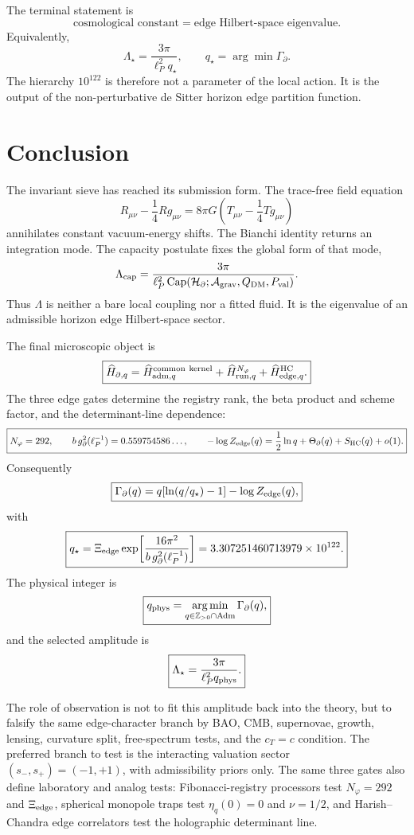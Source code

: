 \documentclass[aps,prd,reprint,nofootinbib,superscriptaddress,floatfix]{revtex4-2}
\numberwithin{equation}{section}
\theoremstyle{definition}
\theoremstyle{plain}
\newcommand{\Agrav}{\mathcal A_{\rm grav}}
\newcommand{\Capacity}{\operatorname{Cap}}
\begin{document}
The terminal statement is
\[
\boxed{
\text{cosmological constant}
=
\text{edge Hilbert-space eigenvalue}.
}
\]
Equivalently,
\[
\boxed{
\Lambda_\star
=
\frac{3\pi}{\ell_P^2 q_\star},
\qquad
q_\star=\arg\min\Gamma_\partial.
}
\]
The hierarchy \(10^{122}\) is therefore not a parameter of the local action.  It
is the output of the non-perturbative de Sitter horizon edge partition
function.



\section{Conclusion}

The invariant sieve has reached its submission form.  The trace-free field
equation
\[
R_{\mu\nu}-\frac14Rg_{\mu\nu}
=
8\pi G\left(T_{\mu\nu}-\frac14Tg_{\mu\nu}\right)
\]
annihilates constant vacuum-energy shifts.  The Bianchi identity returns an
integration mode.  The capacity postulate fixes the global form of that mode,
\[
\Lambda_{\rm cap}
=
\frac{3\pi}
{\ell_P^2\Capacity(\mathcal H_\partial;\Agrav,Q_{\rm DM},P_{\rm val})}.
\]
Thus \(\Lambda\) is neither a bare local coupling nor a fitted fluid.  It is
the eigenvalue of an admissible horizon edge Hilbert-space sector.

The final microscopic object is
\[
\boxed{
\widehat H_{\partial,q}
=
\widehat H_{{\rm adm},q}^{\rm common\ kernel}
+
\widehat H_{{\rm run},q}^{N_\varphi}
+
\widehat H_{{\rm edge},q}^{\rm HC}.
}
\]
The three edge gates determine the registry rank, the beta product and scheme
factor, and the determinant-line dependence:
\[
\boxed{
N_\varphi=292,\qquad
b\,g_\partial^2(\ell_P^{-1})=0.559754586\ldots,
\qquad
-\log Z_{\rm edge}(q)
=
\frac12\ln q+\Theta_\partial(q)+S_{\rm HC}(q)+o(1).
}
\]
Consequently
\[
\boxed{
\Gamma_\partial(q)
=
q[\ln(q/q_\star)-1]-\log Z_{\rm edge}(q),
}
\]
with
\[
\boxed{
q_\star
=
\Xi_{\rm edge}
\exp\!\left[
\frac{16\pi^2}{b\,g_\partial^2(\ell_P^{-1})}
\right]
=
3.307251460713979\times10^{122}.
}
\]
The physical integer is
\[
\boxed{
q_{\rm phys}
=
\operatorname*{arg\,min}_{q\in\mathbb Z_{>0}\cap{\rm Adm}}
\Gamma_\partial(q),
}
\]
and the selected amplitude is
\[
\boxed{
\Lambda_\star
=
\frac{3\pi}{\ell_P^2q_{\rm phys}}.
}
\]

The role of observation is not to fit this amplitude back into the theory, but
to falsify the same edge-character branch by BAO, CMB, supernovae, growth,
lensing, curvature split, free-spectrum tests, and the \(c_T=c\) condition.
The preferred branch to test is the interacting valuation sector
\((s_-,s_+)=(-1,+1)\), with admissibility priors only.  The same three gates
also define laboratory and analog tests: Fibonacci-registry processors test
\(N_\varphi=292\) and \(\Xi_{\rm edge}\), spherical monopole traps test
\(\eta_q(0)=0\) and \(\nu=1/2\), and Harish--Chandra edge correlators test the
holographic determinant line.
\end{document}
